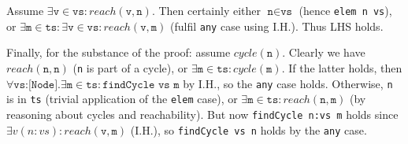 \documentclass[10pt,a4paper]{article}
\newcommand{\cycle}[1]{cycle(\texttt{#1})}
\newcommand{\reach}[2]{reach(\texttt{#1},\texttt{#2})}
\newcommand{\existstin}[2]{\exists\texttt{#1}\in\texttt{#2}}
\begin{document}
Assume \( \existstin v {vs}: \reach v n \).
Then certainly either \(\texttt{n}\in\texttt{vs}\) (hence \texttt{elem n vs}), or \(\existstin m {ts} : \existstin v {vs} : \reach v m \) (fulfil \texttt{any} case using I.H.). Thus LHS holds.

Finally, for the substance of the proof: assume \( \cycle n \).
Clearly we have \( \reach n n \) (\texttt{n} is part of a cycle), or \( \existstin m {ts} : \cycle m \).
If the latter holds, then \( \forall \texttt{vs:[Node].} \existstin m {ts} : \texttt{findCycle vs m} \) by I.H., so the \texttt{any} case holds.
Otherwise, \texttt{n} is in \texttt{ts} (trivial application of the \texttt{elem} case), or \( \existstin m {ts}: \reach n m \) (by reasoning about cycles and reachability).
But now \texttt{findCycle n:vs m} holds since \( \exists v {(n:vs)} : \reach v m \) (I.H.), so \texttt{findCycle vs n} holds by the \texttt{any} case.
\end{document}

